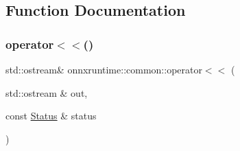\subsection{Function Documentation}
\mbox{\label{namespaceonnxruntime_1_1common_afdb6e3abd4b0273234996893794c5c64}} 
\subsubsection{\texorpdfstring{operator$<$$<$()}{operator<<()}}
{\footnotesize\ttfamily std\+::ostream\& onnxruntime\+::common\+::operator$<$$<$ (\begin{DoxyParamCaption}\item[{std\+::ostream \&}]{out,  }\item[{const \mbox{\hyperlink{classonnxruntime_1_1common_1_1Status}{Status}} \&}]{status }\end{DoxyParamCaption})\hspace{0.3cm}{\ttfamily [inline]}}

